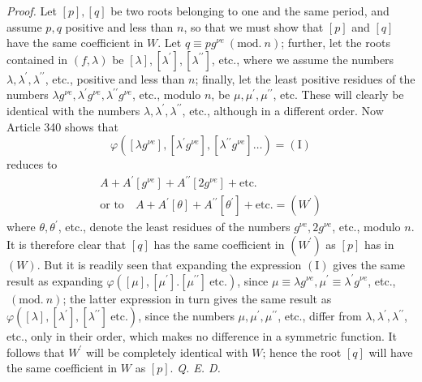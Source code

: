 \textit{Proof.} Let \([p],\allowbreak [q]\) be two roots belonging to one and the same period, and assume \(p,\allowbreak q\) positive and less than \(n\), so that we must show that \([p]\) and \([q]\) have the same coefficient in \(W\). Let \(q\equiv pg^{\nu e}\ (\mathrm{mod.}\ n)\); further, let the roots contained in \((f,\allowbreak \lambda)\) be \([\lambda],\allowbreak [\lambda^{\prime}],\allowbreak [\lambda^{\prime\prime}]\), etc., where we assume the numbers \(\lambda,\allowbreak \lambda^{\prime},\allowbreak \lambda^{\prime\prime}\), etc., positive and less than \(n\); finally, let the least positive residues of the numbers \(\lambda g^{\nu e},\allowbreak \lambda^{\prime} g^{\nu e},\allowbreak \lambda^{\prime\prime} g^{\nu e}\), etc., modulo \(n\), be \(\mu,\allowbreak \mu^{\prime},\allowbreak \mu^{\prime\prime}\), etc. These will clearly be identical with the numbers \(\lambda,\allowbreak \lambda^{\prime},\allowbreak \lambda^{\prime\prime}\), etc., although in a different order. Now Article 340 shows that \[\varphi([\lambda g^{\nu e}],[\lambda^{\prime} g^{\nu e}],[\lambda^{\prime\prime} g^{\nu e}]\ldots)=(\mathrm I)\] reduces to \[\begin{gathered}
A+A^{\prime}[g^{\nu e}]+A^{\prime\prime}[2g^{\nu e}]+\mathrm{etc.}\\
\text{or to}\quad A+A^{\prime}[\theta]+A^{\prime\prime}[\theta^{\prime}]+\mathrm{etc.}=(W^{\prime})
\end{gathered}\] where \(\theta,\allowbreak \theta^{\prime}\), etc., denote the least residues of the numbers \(g^{\nu e},\allowbreak 2g^{\nu e}\), etc., modulo \(n\). It is therefore clear that \([q]\) has the same coefficient in \((W^{\prime})\) as \([p]\) has in \((W)\). But it is readily seen that expanding the expression \((\mathrm I)\) gives the same result as expanding \(\varphi([\mu],\allowbreak [\mu^{\prime}].[\mu^{\prime\prime}]\ \text{etc.})\), since \(\mu\equiv\lambda g^{\nu e},\allowbreak \mu^{\prime}\equiv\lambda^{\prime} g^{\nu e}\), etc., \(\ (\mathrm{mod.}\ n)\); the latter expression in turn gives the same result as \(\varphi([\lambda],\allowbreak [\lambda^{\prime}],\allowbreak [\lambda^{\prime\prime}]\ \text{etc.})\), since the numbers \(\mu,\allowbreak \mu^{\prime},\allowbreak \mu^{\prime\prime}\), etc., differ from \(\lambda,\allowbreak \lambda^{\prime},\allowbreak \lambda^{\prime\prime}\), etc., only in their order, which makes no difference in a symmetric function. It follows that \(W^{\prime}\) will be completely identical with \(W\); hence the root \([q]\) will have the same coefficient in \(W\) as \([p]\). \textit{Q. E. D.}

